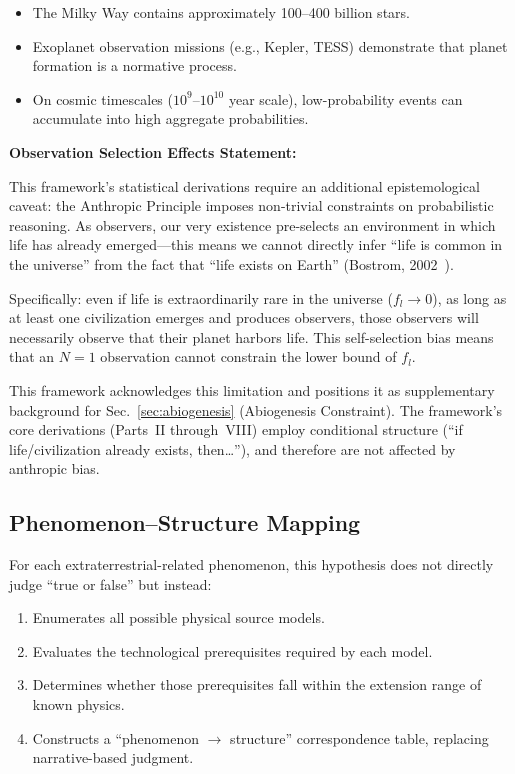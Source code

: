 \documentclass[aps,prd,twocolumn,superscriptaddress,nofootinbib]{revtex4-2}
\begin{document}
\begin{itemize}
  \item The Milky Way contains approximately 100--400 billion stars.
  \item Exoplanet observation missions (e.g., Kepler, TESS) demonstrate that planet formation is a normative process.
  \item On cosmic timescales ($10^{9}$--$10^{10}$ year scale), low-probability events can accumulate into high aggregate probabilities.
\end{itemize}

\textbf{Observation Selection Effects Statement:}

This framework's statistical derivations require an additional epistemological caveat: the Anthropic Principle imposes non-trivial constraints on probabilistic reasoning. As observers, our very existence pre-selects an environment in which life has already emerged---this means we cannot directly infer ``life is common in the universe'' from the fact that ``life exists on Earth'' (Bostrom, 2002~\cite{Bostrom2002}).

Specifically: even if life is extraordinarily rare in the universe ($f_l \to 0$), as long as at least one civilization emerges and produces observers, those observers will necessarily observe that their planet harbors life. This self-selection bias means that an $N=1$ observation cannot constrain the lower bound of $f_l$.

This framework acknowledges this limitation and positions it as supplementary background for Sec.~\ref{sec:abiogenesis} (Abiogenesis Constraint). The framework's core derivations (Parts~II through~VIII) employ conditional structure (``if life/civilization already exists, then\ldots''), and therefore are not affected by anthropic bias.

\subsection{Phenomenon--Structure Mapping}\label{sec:phenom-struct}

For each extraterrestrial-related phenomenon, this hypothesis does not directly judge ``true or false'' but instead:

\begin{enumerate}
  \item Enumerates all possible physical source models.
  \item Evaluates the technological prerequisites required by each model.
  \item Determines whether those prerequisites fall within the extension range of known physics.
  \item Constructs a ``phenomenon $\to$ structure'' correspondence table, replacing narrative-based judgment.
\end{enumerate}
\end{document}
